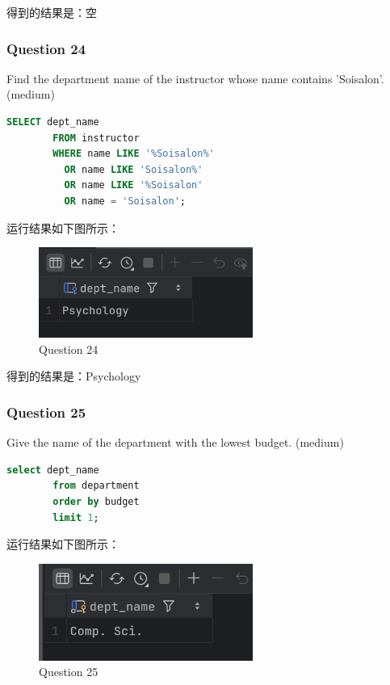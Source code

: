 \documentclass{article}
\begin{document}
    得到的结果是：空
    
    \subsubsection{Question 24}
    
    Find the department name of the instructor whose name contains 'Soisalon'. (medium)
    
    \begin{lstlisting}[language=sql, title=Question 24, tabsize=4]
    	SELECT dept_name
    	FROM instructor
    	WHERE name LIKE '%Soisalon%'
    	  OR name LIKE 'Soisalon%'
    	  OR name LIKE '%Soisalon'
    	  OR name = 'Soisalon';
    \end{lstlisting}
    
    运行结果如下图所示：
    
    \begin{figure}[H]
    	\centering
    	\includegraphics[width=7cm]{./images/28.Question24.png}
    	\caption{Question 24}
    \end{figure}
    
    得到的结果是：Psychology
    
    \subsubsection{Question 25}
    
    Give the name of the department with the lowest budget. (medium)
    
    \begin{lstlisting}[language=sql, title=Question 25, tabsize=4]
    	select dept_name
    	from department
    	order by budget
    	limit 1;
    \end{lstlisting}
    
    运行结果如下图所示：
    
    \begin{figure}[H]
    	\centering
    	\includegraphics[width=7cm]{./images/29.Question25.png}
    	\caption{Question 25}
    \end{figure}
    
\end{document}
